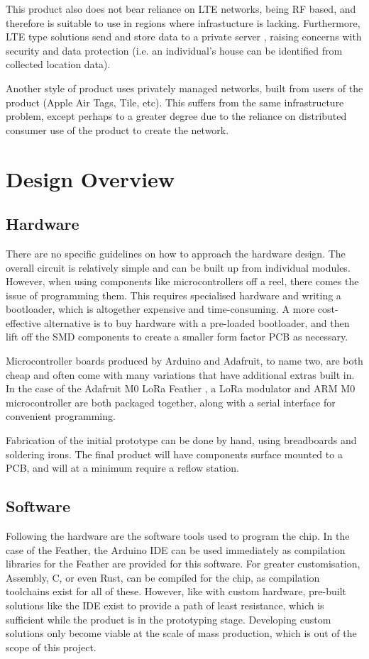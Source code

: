 \documentclass[11pt]{article}
\begin{document}
This product also does not bear reliance on LTE networks, being RF based, and therefore is suitable to use in regions where infrastucture is lacking.
Furthermore, LTE type solutions send and store data to a private server \cite{tractive:privacy}, raising concerns with security and data protection (i.e. an individual's house can be identified from collected location data).

Another style of product uses privately managed networks, built from users of the product (Apple Air Tags, Tile, etc).
This suffers from the same infrastructure problem, except perhaps to a greater degree due to the reliance on distributed consumer use of the product to create the network.

\section{Design Overview}

\subsection{Hardware}

There are no specific guidelines on how to approach the hardware design.
The overall circuit is relatively simple and can be built up from individual modules.
However, when using components like microcontrollers off a reel, there comes the issue of programming them.
This requires specialised hardware and writing a bootloader, which is altogether expensive and time-consuming. 
A more cost-effective alternative is to buy hardware with a pre-loaded bootloader, and then lift off the SMD components to create a smaller form factor PCB as necessary.

Microcontroller boards produced by Arduino and Adafruit, to name two, are both cheap and often come with many variations that have additional extras built in.
In the case of the Adafruit M0 LoRa Feather \cite{adafruit:loram0}, a LoRa modulator and ARM M0 microcontroller are both packaged together, along with a serial interface for convenient programming. 

Fabrication of the initial prototype can be done by hand, using breadboards and soldering irons. The final product will have components surface mounted to a PCB, and will at a minimum require a reflow station.

\subsection{Software}
Following the hardware are the software tools used to program the chip. In the case of the Feather, the Arduino IDE \cite{arduino:ide} can be used immediately as compilation libraries for the Feather are provided for this software.
For greater customisation, Assembly, C, or even Rust, can be compiled for the chip, as compilation toolchains exist for all of these. 
However, like with custom hardware, pre-built solutions like the IDE exist to provide a path of least resistance, which is sufficient while the product is in the prototyping stage. 
Developing custom solutions only become viable at the scale of mass production, which is out of the scope of this project. 
\end{document}
